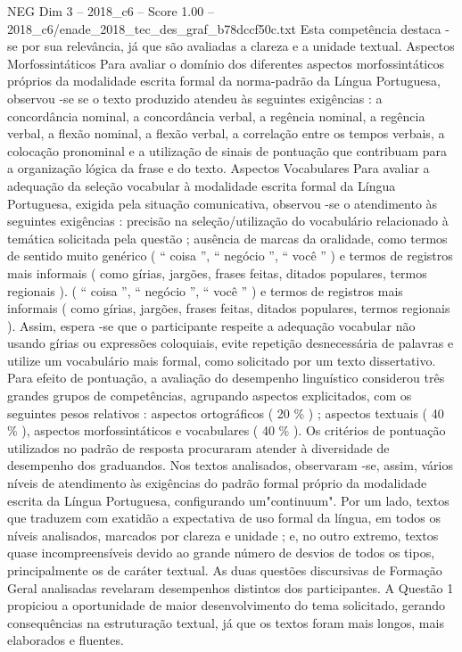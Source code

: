 \begin{textsample}{NEG Dim 3 – 2018\_c6 – Score 1.00 – 2018\_c6/enade\_2018\_tec\_des\_graf\_b78dccf50c.txt}
Esta competência destaca -se por sua relevância, já que são avaliadas a clareza e a unidade textual.
Aspectos Morfossintáticos Para avaliar o domínio dos diferentes aspectos morfossintáticos próprios da modalidade escrita formal da norma-padrão da Língua Portuguesa, observou -se se o texto produzido atendeu às seguintes exigências : a concordância nominal, a concordância verbal, a regência nominal, a regência verbal, a flexão nominal, a flexão verbal, a correlação entre os tempos verbais, a colocação pronominal e a utilização de sinais de pontuação que contribuam para a organização lógica da frase e do texto.
Aspectos Vocabulares Para avaliar a adequação da seleção vocabular à modalidade escrita formal da Língua Portuguesa, exigida pela situação comunicativa, observou -se o atendimento às seguintes exigências : precisão na seleção/utilização do vocabulário relacionado à temática solicitada pela questão ; ausência de marcas da oralidade, como termos de sentido muito genérico ( “ coisa ”, “ negócio ”, “ você ” ) e termos de registros mais informais ( como gírias, jargões, frases feitas, ditados populares, termos regionais ). ( “ coisa ”, “ negócio ”, “ você ” ) e termos de registros mais informais ( como gírias, jargões, frases feitas, ditados populares, termos regionais ).
Assim, espera -se que o participante respeite a adequação vocabular não usando gírias ou expressões coloquiais, evite repetição desnecessária de palavras e utilize um vocabulário mais formal, como solicitado por um texto dissertativo.
Para efeito de pontuação, a avaliação do desempenho linguístico considerou três grandes grupos de competências, agrupando aspectos explicitados, com os seguintes pesos relativos : aspectos ortográficos ( 20 \% ) ; aspectos textuais ( 40 \% ), aspectos morfossintáticos e vocabulares ( 40 \% ).
Os critérios de pontuação utilizados no padrão de resposta procuraram atender à diversidade de desempenho dos graduandos.
Nos textos analisados, observaram -se, assim, vários níveis de atendimento às exigências do padrão formal próprio da modalidade escrita da Língua Portuguesa, configurando um"continuum".
Por um lado, textos que traduzem com exatidão a expectativa de uso formal da língua, em todos os níveis analisados, marcados por clareza e unidade ; e, no outro extremo, textos quase incompreensíveis devido ao grande número de desvios de todos os tipos, principalmente os de caráter textual.
As duas questões discursivas de Formação Geral analisadas revelaram desempenhos distintos dos participantes.
A Questão 1 propiciou a oportunidade de maior desenvolvimento do tema solicitado, gerando consequências na estruturação textual, já que os textos foram mais longos, mais elaborados e fluentes.

\end{textsample}
